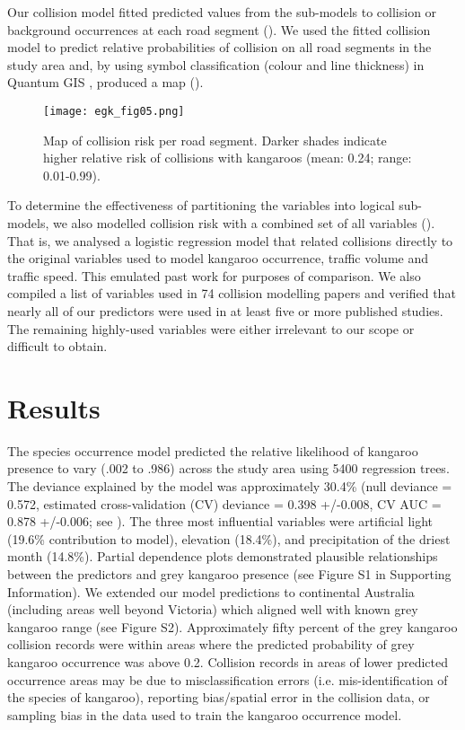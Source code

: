 Our collision model fitted predicted values from the sub-models to collision or background occurrences at each road segment (). We used the fitted collision model to predict relative probabilities of collision on all road segments in the study area and, by using symbol classification (colour and line thickness) in Quantum GIS \citep{qgis09}, produced a map ().

\begin{figure*}[htp]
  \centering
  \texttt{[image: egk\_fig05.png]}
  \caption[Map of collision risk per road segment in Victoria]{Map of collision risk per road segment. Darker shades indicate higher relative risk of collisions with kangaroos (mean: 0.24; range: 0.01-0.99).}
  \label{egk_collmap}
\end{figure*}

To determine the effectiveness of partitioning the variables into logical sub-models, we also modelled collision risk with a combined set of all variables (). That is, we analysed a logistic regression model that related collisions directly to the original variables used to model kangaroo occurrence, traffic volume and traffic speed. This emulated past work for purposes of comparison. We also compiled a list of variables used in 74 collision modelling papers and verified that nearly all of our predictors were used in at least five or more published studies. The remaining highly-used variables were either irrelevant to our scope or difficult to obtain.

\section{Results}

The species occurrence model predicted the relative likelihood of kangaroo presence to vary (.002 to .986) across the study area using 5400 regression trees. The deviance explained by the model was approximately 30.4\% (null deviance = 0.572, estimated cross-validation (CV) deviance = 0.398 +/-0.008, CV AUC = 0.878 +/-0.006; see ). The three most influential variables were artificial light (19.6\% contribution to model), elevation (18.4\%), and precipitation of the driest month (14.8\%). Partial dependence plots demonstrated plausible relationships between the predictors and grey kangaroo presence (see Figure S1 in Supporting Information). We extended our model predictions to continental Australia (including areas well beyond Victoria) which aligned well with known grey kangaroo range (see Figure S2). Approximately fifty percent of the grey kangaroo collision records were within areas where the predicted probability of grey kangaroo occurrence was above 0.2. Collision records in areas of lower predicted occurrence areas may be due to misclassification errors (i.e. mis-identification of the species of kangaroo), reporting bias/spatial error in the collision data, or sampling bias in the data used to train the kangaroo occurrence model.

